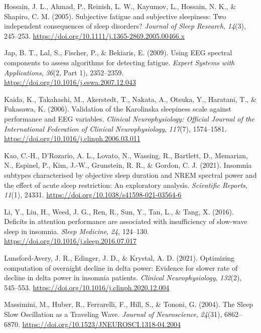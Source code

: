 \documentclass[
]{article}
\newlength{\cslhangindent}
\newenvironment{CSLReferences}[2] %
 {\begin{list}{}{%
  \setlength{\itemindent}{0pt}
  \setlength{\leftmargin}{0pt}
  \setlength{\parsep}{0pt}
  \ifodd #1
   \setlength{\leftmargin}{\cslhangindent}
   \setlength{\itemindent}{-1\cslhangindent}
  \fi
  \setlength{\itemsep}{#2\baselineskip}}}
 {\end{list}}
\begin{document}
\begin{CSLReferences}{1}{0}
Hossain, J. L., Ahmad, P., Reinish, L. W., Kayumov, L., Hossain, N. K.,
\& Shapiro, C. M. (2005). Subjective fatigue and subjective sleepiness:
Two independent consequences of sleep disorders? \emph{Journal of Sleep
Research}, \emph{14}(3), 245--253.
\url{https://doi.org/10.1111/j.1365-2869.2005.00466.x}

Jap, B. T., Lal, S., Fischer, P., \& Bekiaris, E. (2009). Using {EEG}
spectral components to assess algorithms for detecting fatigue.
\emph{Expert Systems with Applications}, \emph{36}(2, Part 1),
2352--2359. \url{https://doi.org/10.1016/j.eswa.2007.12.043}

Kaida, K., Takahashi, M., Akerstedt, T., Nakata, A., Otsuka, Y.,
Haratani, T., \& Fukasawa, K. (2006). Validation of the {Karolinska}
sleepiness scale against performance and {EEG} variables. \emph{Clinical
Neurophysiology: Official Journal of the International Federation of
Clinical Neurophysiology}, \emph{117}(7), 1574--1581.
\url{https://doi.org/10.1016/j.clinph.2006.03.011}

Kao, C.-H., D'Rozario, A. L., Lovato, N., Wassing, R., Bartlett, D.,
Memarian, N., Espinel, P., Kim, J.-W., Grunstein, R. R., \& Gordon, C.
J. (2021). Insomnia subtypes characterised by objective sleep duration
and {NREM} spectral power and the effect of acute sleep restriction: An
exploratory analysis. \emph{Scientific Reports}, \emph{11}(1), 24331.
\url{https://doi.org/10.1038/s41598-021-03564-6}

Li, Y., Liu, H., Weed, J. G., Ren, R., Sun, Y., Tan, L., \& Tang, X.
(2016). Deficits in attention performance are associated with
insufficiency of slow-wave sleep in insomnia. \emph{Sleep Medicine},
\emph{24}, 124--130. \url{https://doi.org/10.1016/j.sleep.2016.07.017}

Lunsford-Avery, J. R., Edinger, J. D., \& Krystal, A. D. (2021).
Optimizing computation of overnight decline in delta power: {Evidence}
for slower rate of decline in delta power in insomnia patients.
\emph{Clinical Neurophysiology}, \emph{132}(2), 545--553.
\url{https://doi.org/10.1016/j.clinph.2020.12.004}

Massimini, M., Huber, R., Ferrarelli, F., Hill, S., \& Tononi, G.
(2004). The {Sleep Slow Oscillation} as a {Traveling Wave}.
\emph{Journal of Neuroscience}, \emph{24}(31), 6862--6870.
\url{https://doi.org/10.1523/JNEUROSCI.1318-04.2004}


\end{CSLReferences}
\end{document}

